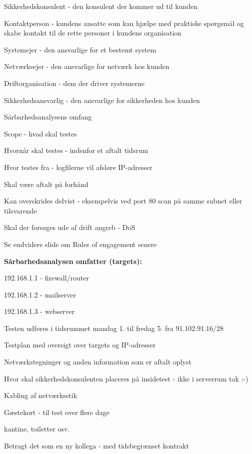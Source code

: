 \documentclass[20pt,landscape,a4paper,footrule]{foils}
\begin{document}

\begin{list2}
\item Sikkerhedskonsulent - den konsulent der kommer ud til kunden 
\item Kontaktperson - kundens ansatte som kan hjælpe med praktiske
  spørgsmål og skabe kontakt til de rette personer i kundens organisation 
\item Systemejer - den ansvarlige for et bestemt system 
\item Netværksejer - den ansvarlige for netværk hos kunden
\item Driftorganisation - dem der driver systemerne
\item Sikkerhedsansvarlig - den ansvarlige for sikkerheden hos kunden 
\end{list2}



\begin{list1}
\item Sårbarhedsanalysens omfang
\begin{list2}
\item Scope - hvad skal testes
\item Hvornår skal testes - indenfor et aftalt tidsrum
\item Hvor testes fra - logfilerne vil afsløre IP-adresser
\item Skal være aftalt på forhånd
\item Kan overskrides delvist - eksempelvis ved port 80 scan på samme
  subnet eller tilsvarende
\item Skal der forsøges ude af drift angreb - DoS
\item Se endvidere slide om Rules of engagement senere   
\end{list2}
\item {\bf Sårbarhedsanalysen omfatter (targets):}
\begin{list2}
\item 192.168.1.1 - firewall/router
\item 192.168.1.2 - mailserver
\item 192.168.1.3 - webserver
\item Testen udføres i tidsrummet mandag 1. til fredag 5. fra 91.102.91.16/28
\end{list2}
\end{list1}



\begin{list1}
\item Testplan med oversigt over targets og IP-adresser
\item Netværkstegninger og anden information som er aftalt oplyst
\item Hvor skal sikkerhedskonsulenten placeres på insidetest - ikke i serverrum tak :-)
\item Kabling af netværksstik
\item Gæstekort - til test over flere dage
\item kantine, toiletter osv.
\end{list1}
\vskip 1cm
\centerline{Betragt det som en ny kollega - med tidsbegrænset kontrakt}
\end{document}
